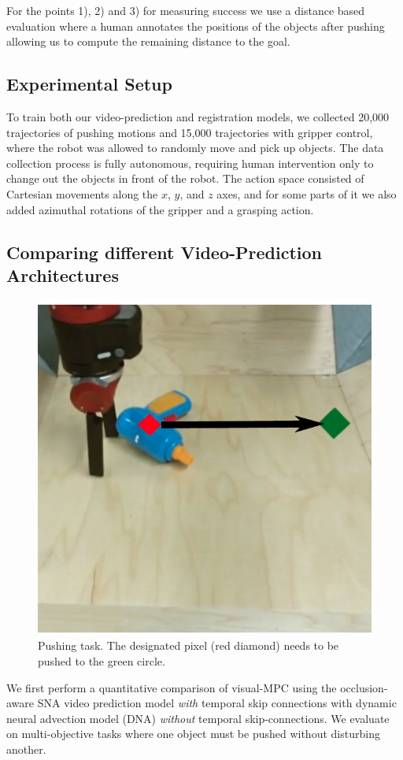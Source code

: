 For the points 1), 2) and 3) for measuring success we use a distance based evaluation where a human annotates the positions of the objects after pushing allowing us to compute the remaining distance to the goal. 


\subsection{Experimental Setup}
To train both our video-prediction and registration models, we collected 20,000 trajectories of pushing motions and 15,000 trajectories with gripper control, where the robot was allowed to randomly move and pick up objects. The data collection process is fully autonomous, requiring human intervention only to change out the objects in front of the robot. The action space consisted of Cartesian movements along the $x$, $y$, and $z$ axes, and for some parts of it we also added azimuthal rotations of the gripper and a grasping action.

\subsection{Comparing different Video-Prediction Architectures}
\label{subsec:sna_experiments}
\begin{figure}
	\centering
	\includegraphics[width=0.30\columnwidth]{images_sna/longdistance_pushing/pushing.pdf}
	\caption{
		Pushing task. The designated pixel (red diamond) needs to be pushed to the green circle.
		\label{fig:long_distance_task}
	}
\end{figure}
We first perform a quantitative comparison of visual-MPC using the occlusion-aware SNA video prediction model \emph{with} temporal skip connections with dynamic neural advection model (DNA)\cite{foresight} \emph{without} temporal skip-connections.
We evaluate on multi-objective tasks where one object must be pushed without disturbing another.

